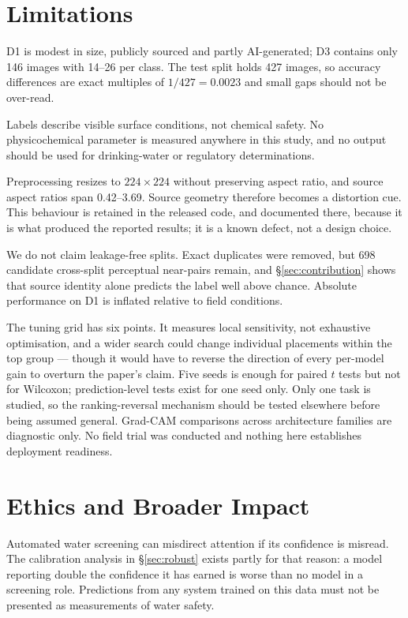 \documentclass[10pt,journal]{IEEEtran}
\begin{document}
\section{Limitations}
D1 is modest in size, publicly sourced and partly AI-generated; D3 contains only 146 images
with 14--26 per class. The test split holds 427 images, so accuracy differences are exact
multiples of $1/427=0.0023$ and small gaps should not be over-read.

Labels describe visible surface conditions, not chemical safety. No physicochemical parameter
is measured anywhere in this study, and no output should be used for drinking-water or
regulatory determinations.

Preprocessing resizes to $224\times224$ without preserving aspect ratio, and source aspect
ratios span 0.42--3.69. Source geometry therefore becomes a distortion cue. This behaviour is
retained in the released code, and documented there, because it is what produced the reported
results; it is a known defect, not a design choice.

We do not claim leakage-free splits. Exact duplicates were removed, but 698 candidate
cross-split perceptual near-pairs remain, and \S\ref{sec:contribution} shows that source
identity alone predicts the label well above chance. Absolute performance on D1 is inflated
relative to field conditions.

The tuning grid has six points. It measures local sensitivity, not exhaustive optimisation,
and a wider search could change individual placements within the top group --- though it
would have to reverse the direction of every per-model gain to overturn the paper's claim.
Five seeds is enough for paired $t$ tests but not for Wilcoxon; prediction-level tests exist
for one seed only. Only one task is studied, so the ranking-reversal mechanism should be
tested elsewhere before being assumed general. Grad-CAM comparisons across architecture
families are diagnostic only. No field trial was conducted and nothing here establishes
deployment readiness.

\section*{Ethics and Broader Impact}
Automated water screening can misdirect attention if its confidence is misread. The
calibration analysis in \S\ref{sec:robust} exists partly for that reason: a model reporting
double the confidence it has earned is worse than no model in a screening role. Predictions
from any system trained on this data must not be presented as measurements of water safety.
\end{document}
